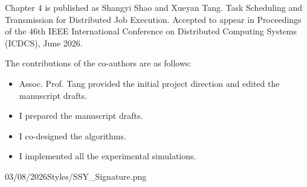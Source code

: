 \documentclass[12pt,a4paper]{Thesis} %
\begin{document}
{
	Chapter 4 is published as {\color{blue} Shangyi Shao and Xueyan Tang. Task Scheduling and Transmission for Distributed Job Execution. Accepted to appear in Proceedings of the 46th IEEE International Conference on Distributed Computing Systems (ICDCS), June 2026.}

	The contributions of the co-authors are as follows:
	\begin{itemize}[topsep=1pt,itemsep=1pt,partopsep=1pt, parsep=1pt]
		\item Assoc. Prof. Tang provided the initial project direction and edited the manuscript drafts.
		\item I prepared the manuscript drafts.
		\item I co-designed the algorithms.
		\item I implemented all the experimental simulations.
	\end{itemize}


}{03/08/2026}{Styles/SSY_Signature.png}
\end{document}
